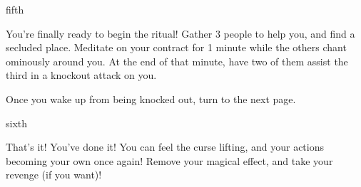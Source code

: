 \documentclass[greennotebook]{NeptuneBall}
\begin{document}
\begin{page}{fifth}

You're finally ready to begin the ritual! Gather 3 people to help you, and find a secluded place. Meditate on your contract for 1 minute while the others chant ominously around you. At the end of that minute, have two of them assist the third in a knockout attack on you.

Once you wake up from being knocked out, turn to the next page.

\end{page}

\begin{page}{sixth}

That's it! You've done it! You can feel the curse lifting, and your actions becoming your own once again! Remove your \iIdentityProtectionSpell{} magical effect, and take your revenge (if you want)!

\end{page}

\endnotebook
\end{document}
